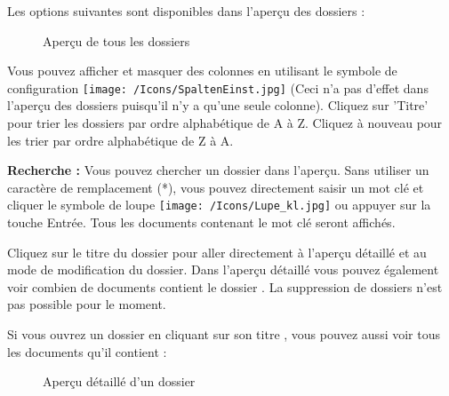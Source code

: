 Les options suivantes sont disponibles dans l'aperçu des dossiers :

\begin{figure}[H]
\caption{Aperçu de tous les dossiers}
\end{figure}

Vous pouvez afficher et masquer des colonnes en utilisant le symbole de configuration \texttt{[image: /Icons/SpaltenEinst.jpg]}  (Ceci n'a pas d'effet dans l'aperçu des dossiers puisqu'il n'y a qu'une seule colonne). Cliquez sur 'Titre'  pour trier les dossiers par ordre alphabétique de A à Z. Cliquez à nouveau pour les trier par ordre alphabétique de Z à A.

\vspace{\baselineskip}

\textbf{Recherche :} Vous pouvez chercher un dossier dans l'aperçu. Sans utiliser un caractère de remplacement (*), vous pouvez directement saisir un mot clé et cliquer le symbole de loupe \texttt{[image: /Icons/Lupe\_kl.jpg]}  ou appuyer sur la touche Entrée. Tous les documents contenant le mot clé seront affichés. \newline

Cliquez sur le titre du dossier  pour aller directement à l'aperçu détaillé et au mode de modification du dossier. Dans l'aperçu détaillé vous pouvez également voir combien de documents contient le dossier . La suppression de dossiers n'est pas possible pour le moment. \newline

Si vous ouvrez un dossier en cliquant sur son titre , vous pouvez aussi voir tous les documents qu'il contient :

\begin{figure}[H]
\caption{Aperçu détaillé d'un dossier}
\end{figure}

